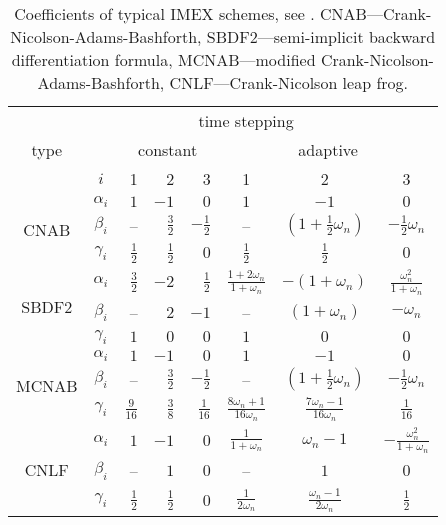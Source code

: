 \begin{table}[!htb]
	\centering
	\caption{Coefficients of typical IMEX schemes, see \cite{Ascher1995,Wang2008}. CNAB---Crank-Nicolson-Adams-Bashforth, SBDF2---semi-implicit backward differentiation formula, MCNAB---modified Crank-Nicolson-Adams-Bashforth, CNLF---Crank-Nicolson leap frog.\label{tbl:TimeSteppingCoefficients}}
	\begin{tabular}{ccrrr|ccc}
		\toprule
		\multirow{3}{*}{type}& & \multicolumn{5}{c}{time stepping} \\
		& & \multicolumn{3}{c|}{constant} & \multicolumn{3}{c}{adaptive}\\
		& $i$ & 1 & 2 & 3 & 1 & 2 & 3 \\
		\midrule
		\multirow{3}{*}{CNAB} & $\alpha_i$ & $1$ & $-1$ & $0$ &
		$1$ & $-1$ & $0$\\
		& $\beta_i$ & -- & $\frac{3}{2}$ & $-\frac{1}{2}$ & 
		-- & $(1+\frac{1}{2}\omega_n)$ & $-\frac{1}{2}\omega_n$\\
		& $\gamma_i$ & $\frac{1}{2}$ & $\frac{1}{2}$ & $0$ &
		$\frac{1}{2}$ & $\frac{1}{2}$ & $0$\\
		\midrule
  		\multirow{3}{*}{SBDF2} & $\alpha_i$ & $\frac{3}{2}$ & $-2$ &
  		$\frac{1}{2}$ & $\frac{1+2\omega_n}{1+\omega_n}$ & $-(1+\omega_n)$ & $\frac{\omega_n^2}{1+\omega_n}$\\
  		& $\beta_i$ & -- & $2$ & $-1$ &
  		-- & $(1+\omega_n)$ & $-\omega_n$\\
  		& $\gamma_i$ & $1$ & $0$ & $0$ & $1$ & $0$ & $0$\\
  		\midrule
  		\multirow{3}{*}{MCNAB} & $\alpha_i$ & $1$ & $-1$ & $0$ & $1$ & $-1$ & $0$\\
  		& $\beta_i$  & -- & $\frac{3}{2}$ & $-\frac{1}{2}$ & 
		-- & $(1+\frac{1}{2}\omega_n)$ & $-\frac{1}{2}\omega_n$\\
  		& $\gamma_i$ & $\frac{9}{16}$ & $\frac{3}{8}$ & $\frac{1}{16}$ & 
  		$\frac{8\omega_n+1}{16\omega_n}$ & $\frac{7\omega_n-1}{16\omega_n}$ & $\frac{1}{16}$\\
  		\midrule
  		\multirow{3}{*}{CNLF} & $\alpha_i$ & $1$ & $-1$ & $0$ 
  		& $\frac{1}{1+\omega_n}$ & $\omega_n-1$ & $-\frac{\omega_n^2}{1+\omega_n}$\\
  		& $\beta_i$ & -- & $1$ & $0$ & -- & $1$ & $0$ \\
  		& $\gamma_i$  & $\frac{1}{2}$ & $\frac{1}{2}$ & $0$ &
  		$\frac{1}{2\omega_n}$ & $\frac{\omega_n-1}{2\omega_n}$ & $\frac{1}{2}$\\
  		\bottomrule
	\end{tabular}
\end{table}

